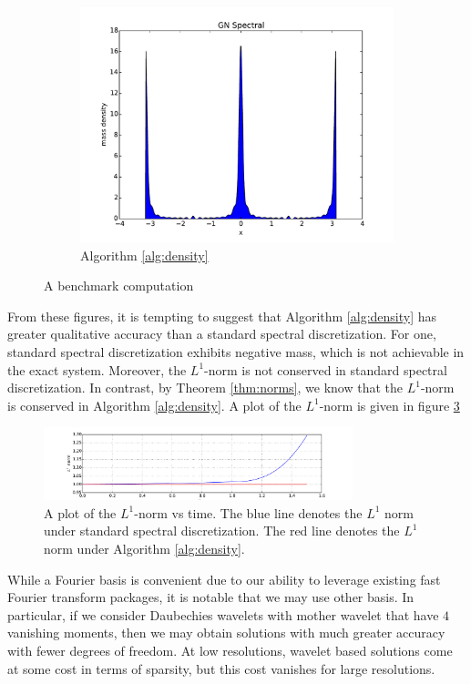 \documentclass[12pt]{amsart}
\begin{document}
\begin{figure}
\begin{subfigure}{0.3\textwidth}
		\includegraphics[width=\textwidth]{./images/gn_spectral_1D.pdf}
		\caption{Algorithm \ref{alg:density}}
		\label{fig:gn spectral}
	\end{subfigure}
	\caption{A benchmark computation}
	\label{fig:S1}
\end{figure}

From these figures, it is tempting to suggest that Algorithm \ref{alg:density} has greater qualitative accuracy than a standard spectral discretization.
For one, standard spectral discretization exhibits negative mass, which is not achievable in the exact system.
Moreover, the $L^{1}$-norm is not conserved in standard spectral discretization.  In contrast, by Theorem \ref{thm:norms}, we know that
the $L^{1}$-norm is conserved in Algorithm \ref{alg:density}.
A plot of the $L^{1}$-norm is given in figure \ref{fig:L1}

\begin{figure}
	\centering
	\includegraphics[width=0.8\textwidth]{./images/L1_plot.pdf}
	\caption{A plot of the $L^{1}$-norm vs time.
		The blue line denotes the $L^{1}$ norm under standard spectral discretization.
		The red line denotes the $L^{1}$ norm under Algorithm \ref{alg:density}.
	}
	\label{fig:L1}
\end{figure}

While a Fourier basis is convenient due to our ability to leverage existing fast Fourier transform packages, it is notable that we may use other basis.
In particular, if we consider Daubechies wavelets with mother wavelet that have $4$ vanishing moments, then we may obtain solutions with much greater
accuracy with fewer degrees of freedom. 
At low resolutions, wavelet based solutions come at some cost in terms of sparsity, but this cost vanishes for large resolutions.
\end{document}
